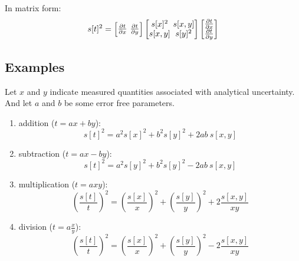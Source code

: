 \documentclass{article}
\begin{document}
\begin{multicols}{3}
In matrix form:
\begin{equation}
s[t]^2 = 
\left[
\begin{array}{@{}c@{~}c@{}}
\frac{\partial t}{\partial x}&\frac{\partial t}{\partial y}
\end{array}
\right]
\left[
\begin{array}{@{}c@{~}c@{}}
s[x]^2 & s[x,y]\\
s[x,y] & s[y]^2
\end{array}
\right]
\left[
\begin{array}{@{}c@{}}
\frac{\partial t}{\partial x} \\
\frac{\partial t}{\partial y}
\end{array}
\right]
\label{eq:s2tmatrix}
\end{equation}

\subsection{Examples}

Let $x$ and $y$ indicate measured quantities associated with
analytical uncertainty.  And let $a$ and $b$ be some error free
parameters.
\begin{enumerate}
\item{addition ($t = a x + b y$):}
\begin{equation}
  s[t]^2 = a^2 s[x]^2 + b^2 s[y]^2 + 2ab~s[x,y]
  \label{eq:addition}
\end{equation}

\item{subtraction ($t = a x - b y$):}
\begin{equation}
s[t]^2 = a^2 s[y]^2 + b^2 s[y]^2 - 2ab~s[x,y]
\label{eq:subtraction}
\end{equation}

\item{multiplication ($t = a x y$):}
\begin{equation}
\left(\frac{s[t]}{t}\right)^2 = \left(\frac{s[x]}{x}\right)^2 + 
  \left(\frac{s[y]}{y}\right)^2 + 2 \frac{s[x,y]}{x y}
\label{eq:multiplication}
\end{equation}

\item{division ($t = a \frac{x}{y}$):}
\begin{equation}
  \left(\frac{s[t]}{t}\right)^2 = \left(\frac{s[x]}{x}\right)^2 + 
  \left(\frac{s[y]}{y}\right)^2 - 2 \frac{s[x,y]}{x y}
\label{eq:division}
\end{equation}


\end{enumerate}
\end{multicols}
\end{document}
